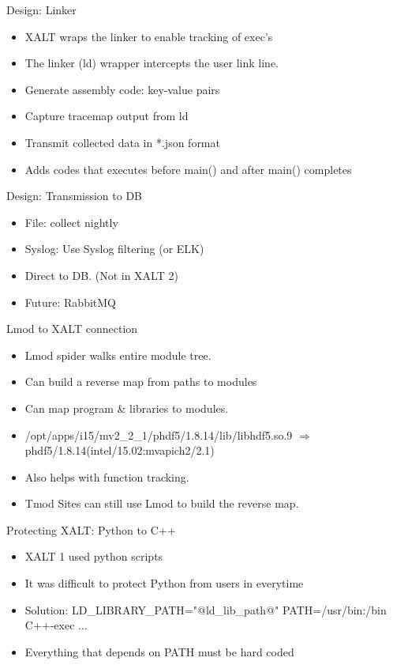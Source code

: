 \documentclass{beamer}
\begin{document}
\begin{frame}{Design: Linker}
  \begin{itemize}
    \item XALT wraps the linker to enable tracking of exec's
    \item The linker (ld) wrapper intercepts the user link line.
    \item Generate assembly code: key-value pairs
    \item Capture tracemap output from ld
    \item Transmit collected data in *.json format
    \item Adds codes that executes before main() and after main() completes
  \end{itemize}
\end{frame}

\begin{frame}{Design: Transmission to DB}
  \begin{itemize}
    \item File: collect nightly
    \item Syslog: Use Syslog filtering (or ELK)
    \item Direct to DB. (Not in XALT 2)
    \item Future: RabbitMQ
  \end{itemize}
\end{frame}

\begin{frame}{Lmod to XALT connection}
  \begin{itemize}
    \item Lmod spider walks entire module tree.
    \item Can build a reverse map from paths to modules
    \item Can map program \& libraries to modules.
    \item /opt/apps/i15/mv2\_2\_1/phdf5/1.8.14/lib/libhdf5.so.9
      $\Rightarrow$ phdf5/1.8.14(intel/15.02:mvapich2/2.1)
    \item Also helps with function tracking.
    \item Tmod Sites can still use Lmod to build the reverse map.
  \end{itemize}
\end{frame}

\begin{frame}{Protecting XALT: Python to C++}
    \begin{itemize}
      \item XALT 1 used python scripts
      \item It was difficult to protect Python from users in everytime
      \item Solution: LD\_LIBRARY\_PATH="@ld\_lib\_path@"
        PATH=/usr/bin:/bin C++-exec ...
      \item Everything that depends on PATH must be hard coded
    \end{itemize}
\end{frame}
\end{document}
